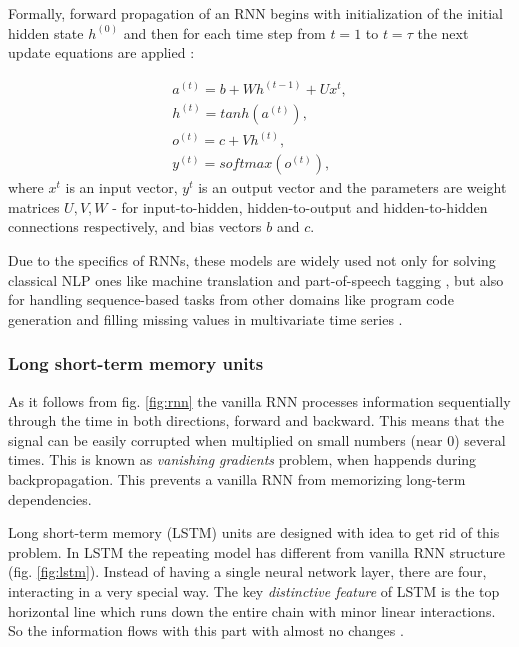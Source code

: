 Formally, forward propagation of an RNN begins with initialization of the initial hidden state $h^{(0)}$ and then for each time step from $t=1$ to $t=\tau$ the next update equations are applied \citep{Goodfellow-2016}:

\begin{equation}\label{eq:rnn}
\begin{gathered} 
    a^{(t)} = b+Wh^{(t-1)}+Ux^{t}, \\
    h^{(t)} = tanh(a^{(t)}), \\
    o^{(t)} = c+Vh^{(t)}, \\
    y^{(t)} = softmax(o^{(t)}),
\end{gathered}
\end{equation}
where $x^{t}$ is an input vector, $y^{t}$ is an output vector and the parameters are weight matrices $U, V, W$ - for input-to-hidden, hidden-to-output and hidden-to-hidden connections respectively, and bias vectors $b$ and $c$.

Due to the specifics of RNNs, these models are widely used not only for solving classical NLP ones like machine translation \citep{Chen-2018} and part-of-speech tagging \citep{Plank-2016}, but also for handling sequence-based tasks from other domains like program code generation \citep{Stehnii-2017} and filling missing values in multivariate time series \citep{Che-2016}.

\subsubsection{Long short-term memory units}
\label{sec:lstm}
As it follows from fig. \ref{fig:rnn} the vanilla RNN processes information sequentially through the time in both directions, forward and backward. This means that the signal can be easily corrupted when multiplied on small numbers (near 0) several times. This is known as \textit{vanishing gradients} problem, when happends during backpropagation. This prevents a vanilla RNN from memorizing long-term dependencies.

Long short-term memory (LSTM) units are designed with idea to get rid of this problem. In LSTM the repeating model has different from vanilla RNN structure (fig. \ref{fig:lstm}). Instead of having a single neural network layer, there are four, interacting in a very special way. The key \textit{distinctive feature} of LSTM is the top horizontal line which runs down the entire chain with minor linear interactions. So the information flows with this part with almost no changes \citep{Olah-2015}.

